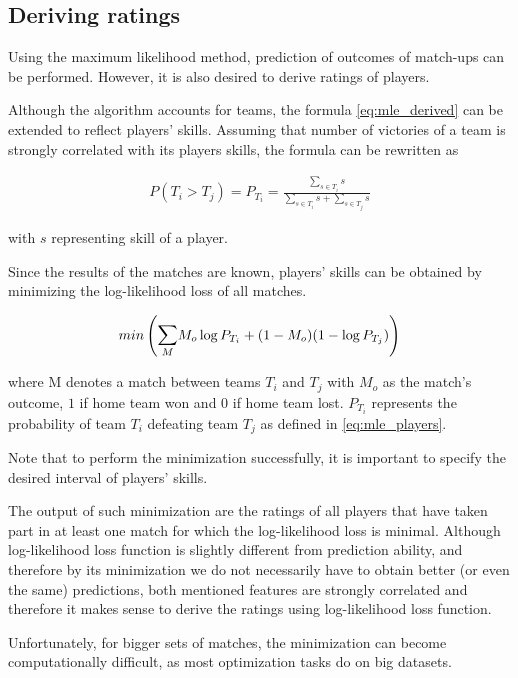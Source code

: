\subsection{Deriving ratings}
Using the maximum likelihood method, prediction of outcomes of match-ups can be performed. However, it is also desired to derive ratings of players. 

Although the algorithm accounts for teams, the formula \eqref{eq:mle_derived} can be extended to reflect players' skills. Assuming that number of victories of a team is strongly correlated with its players skills, the formula can be rewritten as

\begin{align}
\label{eq:mle_players}
P(T_i > T_j) = P_{T_i} = \frac{\sum\limits_{s \in T_i}s}{\sum\limits_{s \in T_i}s + \sum\limits_{s \in T_j}s}
\end{align}

\noindent with $s$ representing skill of a player.

Since the results of the matches are known, players' skills can be obtained by minimizing the log-likelihood loss of all matches.

\begin{align}
min\left(\mathlarger{\sum}_{M}{M_o\log{P_{T_i}} + (1-M_o)(1-\log{P_{T_j}})}\right)
\end{align}

\noindent where M denotes a match between teams $T_i$ and $T_j$ with $M_o$ as the match's outcome, $1$ if home team won and $0$ if home team lost. $P_{T_i}$ represents the probability of team $T_i$ defeating team $T_j$ as defined in \eqref{eq:mle_players}.

Note that to perform the minimization successfully, it is important to specify the desired interval of players' skills.

The output of such minimization are the ratings of all players that have taken part in at least one match for which the log-likelihood loss is minimal. Although log-likelihood loss function is slightly different from prediction ability, and therefore by its minimization we do not necessarily have to obtain better (or even the same) predictions, both mentioned features are strongly correlated and therefore it makes sense to derive the ratings using log-likelihood loss function.

Unfortunately, for bigger sets of matches, the minimization can become computationally difficult, as most optimization tasks do on big datasets.
